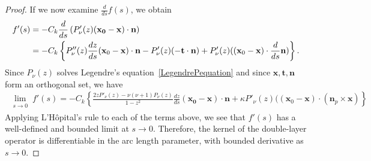 \begin{proof}
If we now examine $\frac{d}{ds}f(s)$, we obtain
\begin{align*} 
  f'(s)&= -C_k \frac{d}{ds}\left( P'_\nu(z)(\mathbf{x_0}-\mathbf{x}) \cdot 
    \mathbf{n} \right) \\
  &=-C_{k} \left\{P''_{\nu}(z) \frac{dz}{ds}
    (\mathbf{x}_{0}-\mathbf{x})  \cdot \mathbf{n} - P'_{\nu}(z)
    (-\mathbf{t} \cdot \mathbf{n}) + P'_\nu(z)((\mathbf{x}_{0} -
    \mathbf{x}) \cdot \frac{d}{ds}\mathbf{n})\right\}.
 \end{align*}
Since $P_\nu(z)$ solves Legendre's equation~\eqref{LegendrePequation}
and since $\mathbf{x},\mathbf{t}, \mathbf{n}$ form an orthogonal set,
we have
\begin{align*}
  \lim_{\substack {s \rightarrow 0}} f'(s) =-C_k
  \left\{\frac{2zP'_{\nu}(z)-\nu(\nu+1)P_{\nu}(z)}{1-z^2}
  \frac{dz}{ds}(\mathbf{x_0}-\mathbf{x})\cdot \mathbf{n} + \kappa
  P'_\nu(z)((\mathbf{x}_{0}-\mathbf{x})\cdot (\mathbf{n}_{p} \times 
  \mathbf{x})\right\}
\end{align*}
Applying L'H\^{o}pital's rule to each of the terms above, we see that
$f'(s)$ has a well-defined and bounded limit at $s \rightarrow 0$.
Therefore, the kernel of the double-layer operator is differentiable in
the arc length parameter, with bounded derivative as $s \rightarrow 0$. 


\end{proof}

